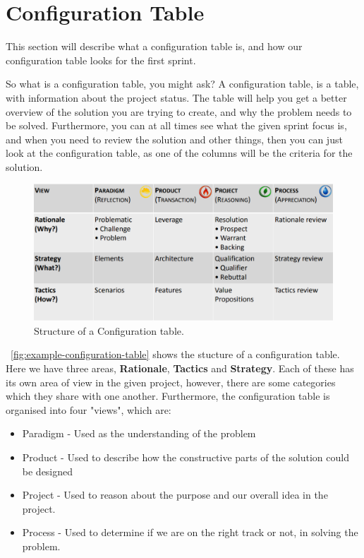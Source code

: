 \section{Configuration Table}\label{sec:first-configuration-table}
This section will describe what a configuration table is, and how our configuration table looks for the first sprint.

So what is a configuration table, you might ask?
A configuration table, is a table, with information about the project status. 
The table will help you get a better overview of the solution you are trying to create, and why the problem needs to be solved.
Furthermore, you can at all times see what the given sprint focus is, and when you need to review the solution and other things, then you can just look at the configuration table, as one of the columns will be the criteria for the solution.


\begin{figure}[h]
    \centering
    \includegraphics[width=\linewidth]{images/configurationTableExample.png}
    \caption{Structure of a Configuration table.}
    \label{fig:example-configuration-table}
\end{figure}

~\autoref{fig:example-configuration-table} shows the stucture of a configuration table.
Here we have three areas, \textbf{Rationale}, \textbf{Tactics} and \textbf{Strategy}.
Each of these has its own area of view in the given project, however, there are some categories which they share with one another.
Furthermore, the configuration table is organised into four "views", which are:

\begin{itemize}
    \item Paradigm - Used as the understanding of the problem
    \item Product - Used to describe how the constructive parts of the solution could be designed
    \item Project - Used to reason about the purpose and our overall idea in the project.
    \item Process - Used to determine if we are on the right track or not, in solving the problem. 
\end{itemize}

